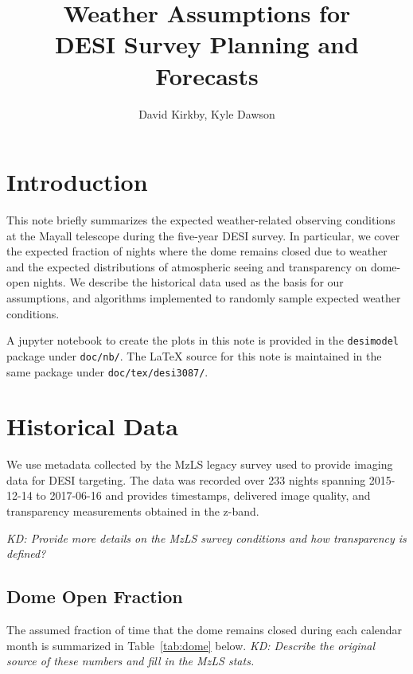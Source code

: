 \documentclass[12pt]{article}
\title{Weather Assumptions for\\
DESI Survey Planning and Forecasts\\
\vspace{5mm}{\large\bf DESI-doc-3087-v1}}
\author{David Kirkby, Kyle Dawson}
\providecommand{\tab}[1]{Table~\ref{tab:#1}}
\begin{document}
\maketitle

\section{Introduction}

This note briefly summarizes the expected weather-related observing conditions at the Mayall telescope during the five-year DESI survey.  In particular, we cover the expected fraction of nights where the dome remains closed due to weather and the expected distributions of atmospheric seeing and transparency on dome-open nights.  We describe the historical data used as the basis for our assumptions, and algorithms implemented to randomly sample expected weather conditions.

A jupyter notebook to create the plots in this note is provided in the {\tt desimodel} package
under {\tt doc/nb/}.  The LaTeX source for this note is maintained in the same package under {\tt doc/tex/desi3087/}.

\section{Historical Data}

We use metadata collected by the MzLS legacy survey\cite{desi-2947} used to provide imaging data for DESI targeting.  The data was recorded over 233 nights spanning 2015-12-14 to 2017-06-16 and provides timestamps, delivered image quality, and transparency measurements obtained in the z-band.

{\em KD: Provide more details on the MzLS survey conditions and how transparency is defined?}

\subsection{Dome Open Fraction}

The assumed fraction of time that the dome remains closed during each calendar month is summarized in \tab{dome} below. {\em KD: Describe the original source of these numbers and fill in the MzLS stats.}
\end{document}
